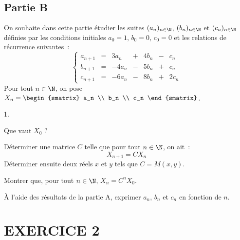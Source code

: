 \documentclass[11pt]{article}%
\begin{document}
 
 \subsection*{Partie B}

 \noindent 
 On souhaite dans cette partie étudier les suites $(a_n)_{n 
 \in \N}$, $(b_n)_{n \in \N}$ et $(c_n)_{n \in 
 \N}$ définies par les conditions initiales $a_0=1$, $b_0=0$, 
 $c_0=0$ et les relations de récurrence suivantes~:
 \[ 
  \left\{ 
  \begin{array}{rcrrrrr} 
  a_{n+1} & = & 3 a_n & + & 4 b_n & - & c_n \\ 
  b_{n+1} & = & -4 a_n & - & 5 b_n & + & c_n \\ 
  c_{n+1} & = & -6 a_n & - & 8 b_n & + & 2 c_n 
  \end{array} 
  \right. 
 \]
 Pour tout $n \in \N$, on pose $X_n = 
 \begin{smatrix} 
 a_n \\ 
 b_n \\ 
 c_n 
 \end{smatrix}$.
\begin{noliste}{1.}
\setlength{\itemsep}{2mm}
\setcounter{enumi}{8}
\item Que vaut $X_0$ ?




\item Déterminer une matrice $C$ telle que pour tout $n \in \N$, on
  ait~:
  \[ 
  X_{n+1} = C X_n 
  \]
  Déterminer ensuite deux réels $x$ et $y$ tels que $C = M(x,y)$.
  





\item Montrer que, pour tout $n \in \N$, $X_n = C^n X_0$.

  

\item À l'aide des résultats de la partie A, exprimer $a_n$, $b_n$ et 
$c_n$ en fonction de $n$.



\end{noliste}




\section*{EXERCICE 2}
\end{document}
